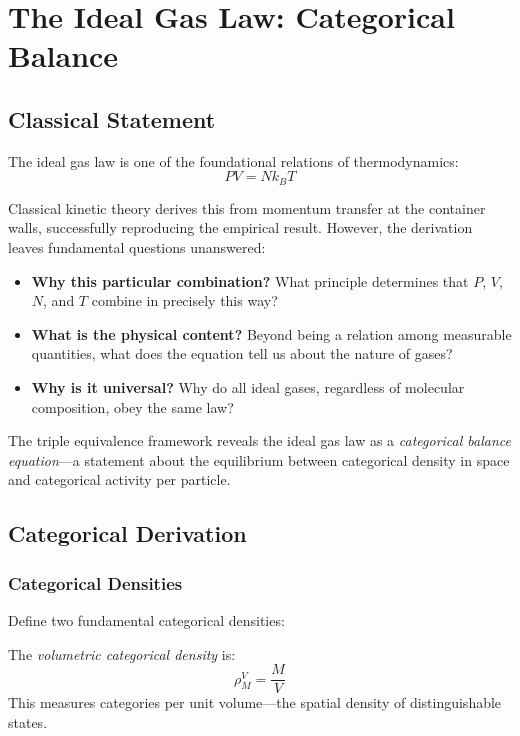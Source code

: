 \section{The Ideal Gas Law: Categorical Balance}
\label{sec:ideal_gas_law}

\subsection{Classical Statement}

The ideal gas law is one of the foundational relations of thermodynamics:
\begin{equation}
PV = Nk_B T
\end{equation}

Classical kinetic theory derives this from momentum transfer at the container walls, successfully reproducing the empirical result. However, the derivation leaves fundamental questions unanswered:

\begin{itemize}
\item \textbf{Why this particular combination?} What principle determines that $P$, $V$, $N$, and $T$ combine in precisely this way?
\item \textbf{What is the physical content?} Beyond being a relation among measurable quantities, what does the equation tell us about the nature of gases?
\item \textbf{Why is it universal?} Why do all ideal gases, regardless of molecular composition, obey the same law?
\end{itemize}

The triple equivalence framework reveals the ideal gas law as a \textit{categorical balance equation}---a statement about the equilibrium between categorical density in space and categorical activity per particle.

\subsection{Categorical Derivation}

\subsubsection{Categorical Densities}

Define two fundamental categorical densities:

\begin{definition}
The \textit{volumetric categorical density} is:
\begin{equation}
\rho_M^V = \frac{M}{V}
\end{equation}
This measures categories per unit volume—the spatial density of distinguishable states.
\end{definition}


